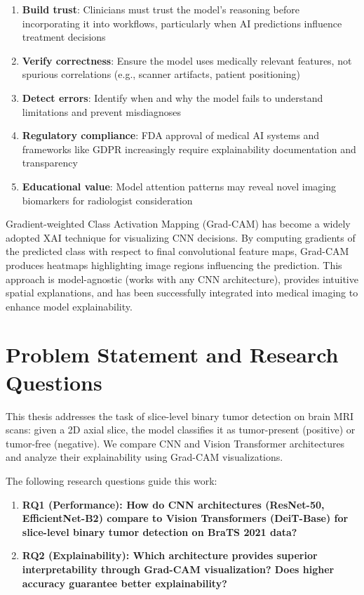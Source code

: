 \begin{enumerate}
    \item \textbf{Build trust}: Clinicians must trust the model's reasoning before incorporating it into workflows, particularly when AI predictions influence treatment decisions
    \item \textbf{Verify correctness}: Ensure the model uses medically relevant features, not spurious correlations (e.g., scanner artifacts, patient positioning)
    \item \textbf{Detect errors}: Identify when and why the model fails to understand limitations and prevent misdiagnoses
    \item \textbf{Regulatory compliance}: FDA approval of medical AI systems and frameworks like GDPR increasingly require explainability documentation and transparency
    \item \textbf{Educational value}: Model attention patterns may reveal novel imaging biomarkers for radiologist consideration
\end{enumerate}

Gradient-weighted Class Activation Mapping (Grad-CAM) \cite{selvaraju2017grad} has become a widely adopted XAI technique for visualizing CNN decisions. By computing gradients of the predicted class with respect to final convolutional feature maps, Grad-CAM produces heatmaps highlighting image regions influencing the prediction. This approach is model-agnostic (works with any CNN architecture), provides intuitive spatial explanations, and has been successfully integrated into medical imaging to enhance model explainability.

\section{Problem Statement and Research Questions}

This thesis addresses the task of slice-level binary tumor detection on brain MRI scans: given a 2D axial slice, the model classifies it as tumor-present (positive) or tumor-free (negative). We compare CNN and Vision Transformer architectures and analyze their explainability using Grad-CAM visualizations.

The following research questions guide this work:

\begin{enumerate}
    \item \textbf{RQ1 (Performance): How do CNN architectures (ResNet-50, EfficientNet-B2) compare to Vision Transformers (DeiT-Base) for slice-level binary tumor detection on BraTS 2021 data?}

    \item \textbf{RQ2 (Explainability): Which architecture provides superior interpretability through Grad-CAM visualization? Does higher accuracy guarantee better explainability?}
\end{enumerate}


